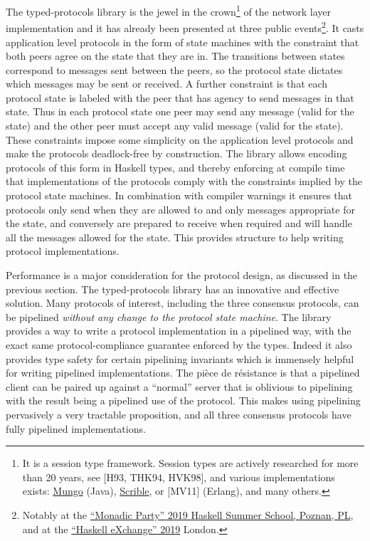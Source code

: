 \documentclass[]{article}
\begin{document}
The typed-protocols library is the jewel in the crown\footnote{It is a
  session type framework. Session types are actively researched for more
  than 20 years, see {[}H93, THK94, HVK98{]}, and various
  implementations exists:
  \href{http://www.dcs.gla.ac.uk/research/mungo/}{{Mungo}} (Java),
  \href{http://www.scrible.org}{{Scrible}}, or {[}MV11{]} (Erlang), and
  many others.} of the network layer implementation and it has already
been presented at three public events\footnote{Notably at the
  \href{https://monadic.party/\#talks}{``Monadic Party'' 2019 Haskell
  Summer School, Poznan, PL}, and at the
  \href{https://skillsmatter.com/conferences/11741-haskell-exchange-2019\#program}{{``Haskell
  eXchange'' 2019}} London.}. It casts application level protocols in
the form of state machines with the constraint that both peers agree on
the state that they are in. The transitions between states correspond to
messages sent between the peers, so the protocol state dictates which
messages may be sent or received. A further constraint is that each
protocol state is labeled with the peer that has agency to send messages
in that state. Thus in each protocol state one peer may send any message
(valid for the state) and the other peer must accept any valid message
(valid for the state). These constraints impose some simplicity on the
application level protocols and make the protocols deadlock-free by
construction. The library allows encoding protocols of this form in
Haskell types, and thereby enforcing at compile time that
implementations of the protocols comply with the constraints implied by
the protocol state machines. In combination with compiler warnings it
ensures that protocols only send when they are allowed to and only
messages appropriate for the state, and conversely are prepared to
receive when required and will handle all the messages allowed for the
state. This provides structure to help writing protocol implementations.

Performance is a major consideration for the protocol design, as
discussed in the previous section. The typed-protocols library has an
innovative and effective solution. Many protocols of interest, including
the three consensus protocols, can be pipelined \emph{without any change
to the protocol state machine}. The library provides a way to write a
protocol implementation in a pipelined way, with the exact same
protocol-compliance guarantee enforced by the types. Indeed it also
provides type safety for certain pipelining invariants which is
immensely helpful for writing pipelined implementations. The pièce de
résistance is that a pipelined client can be paired up against a
``normal'' server that is oblivious to pipelining with the result being
a pipelined use of the protocol. This makes using pipelining pervasively
a very tractable proposition, and all three consensus protocols have
fully pipelined implementations.
\end{document}
